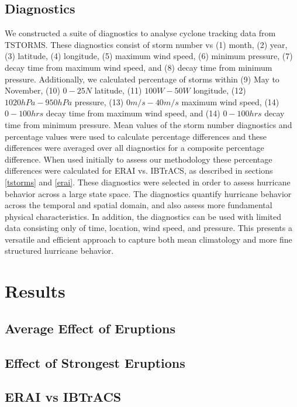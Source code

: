 \subsection{Diagnostics}
\label{diags}
We constructed a suite of diagnostics to analyse cyclone tracking data from TSTORMS. These diagnostics consist of storm number vs (1) month, (2) year, (3) latitude, (4) longitude, (5) maximum wind speed, (6) minimum pressure, (7) decay time from maximum wind speed, and (8) decay time from minimum pressure. Additionally, we calculated percentage of storms within (9) May to November, (10) $0-25N$ latitude, (11) $100W-50W$ longitude, (12) $1020hPa-950hPa$ pressure, (13) $0m/s-40m/s$ maximum wind speed, (14) $0-100hrs$ decay time from maximum wind speed, and (14) $0-100hrs$ decay time from minimum pressure. Mean values of the storm number diagnostics and percentage values were used to calculate percentage differences and these differences were averaged over all diagnostics for a composite percentage difference. When used initially to assess our methodology these percentage differences were calculated for ERAI vs. IBTrACS, as described in sections \ref{tstorms} and \ref{erai}. These diagnostics were selected in order to assess hurricane behavior across a large state space. The diagnostics quantify hurricane behavior across the temporal and spatial domain, and also assess more fundamental physical characteristics. In addition, the diagnostics can be used with limited data consisting only of time, location, wind speed, and pressure. This presents a versatile and efficient approach to capture both mean climatology and more fine structured hurricane behavior.       

\section{Results}
\label{results}

\subsection{Average Effect of Eruptions}

\subsection{Effect of Strongest Eruptions}

\subsection{ERAI vs IBTrACS}

